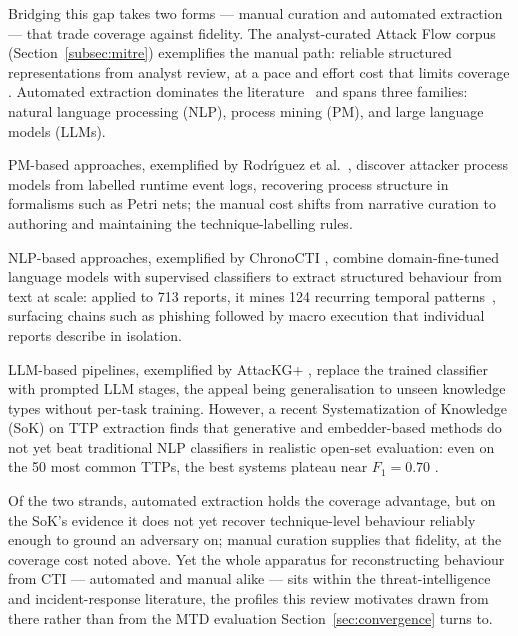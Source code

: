 Bridging this gap takes two forms --- manual curation and automated extraction --- that trade coverage against fidelity. The analyst-curated Attack Flow corpus (Section~\ref{subsec:mitre}) exemplifies the manual path: reliable structured representations from analyst review, at a pace and effort cost that limits coverage \cite{ctid2025attackflow}. Automated extraction dominates the literature~\cite{buchel2025} and spans three families: natural language processing (NLP), process mining (PM), and large language models (LLMs).

PM-based approaches, exemplified by Rodr{\'\i}guez et al.\ \cite{rodriguez2024}, discover attacker process models from labelled runtime event logs, recovering process structure in formalisms such as Petri nets; the manual cost shifts from narrative curation to authoring and maintaining the technique-labelling rules.

NLP-based approaches, exemplified by ChronoCTI \cite{rahman2025}, combine domain-fine-tuned language models with supervised classifiers to extract structured behaviour from text at scale: applied to 713 reports, it mines 124 recurring temporal patterns~\cite{rahman2025}, surfacing chains such as phishing followed by macro execution that individual reports describe in isolation.

LLM-based pipelines, exemplified by AttacKG+ \cite{zhangY2025}, replace the trained classifier with prompted LLM stages, the appeal being generalisation to unseen knowledge types without per-task training. However, a recent Systematization of Knowledge (SoK) on TTP extraction finds that generative and embedder-based methods do not yet beat traditional NLP classifiers in realistic open-set evaluation: even on the 50 most common TTPs, the best systems plateau near $F_1 = 0.70$ \cite{buchel2025}.

Of the two strands, automated extraction holds the coverage advantage, but on the SoK's evidence it does not yet recover technique-level behaviour reliably enough to ground an adversary on; manual curation supplies that fidelity, at the coverage cost noted above. Yet the whole apparatus for reconstructing behaviour from CTI --- automated and manual alike --- sits within the threat-intelligence and incident-response literature, the profiles this review motivates drawn from there rather than from the MTD evaluation Section~\ref{sec:convergence} turns to.

